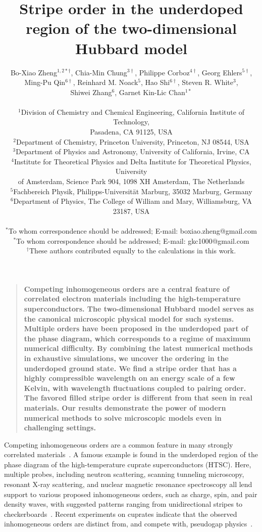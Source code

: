\documentclass[12pt]{article}
\title{Stripe order in the underdoped region of the two-dimensional Hubbard model}
\author{Bo-Xiao Zheng$^{1,2\ast\dag}$, Chia-Min Chung$^{3\dag}$, Philippe Corboz$^{4\dag}$, Georg Ehlers$^{5\dag}$,\\
  Ming-Pu Qin$^{6\dag}$, Reinhard M. Noack$^{5}$, Hao Shi$^{6\dag}$, Steven R. White$^{3}$, \\
  Shiwei Zhang$^{6}$, Garnet Kin-Lic Chan$^{1\ast}$\\
\\
\normalsize{$^{1}$Division of Chemistry and Chemical Engineering, California Institute of Technology,}\\
\normalsize{Pasadena, CA 91125, USA}\\
\normalsize{$^{2}$Department of Chemistry, Princeton University, Princeton, NJ 08544, USA}\\
\normalsize{$^{3}$Department of Physics and Astronomy, University of California, Irvine, CA}\\
\normalsize{$^{4}$Institute for Theoretical Physics and Delta Institute for Theoretical Physics, University }\\
\normalsize{of Amsterdam, Science Park 904, 1098 XH Amsterdam, The Netherlands}\\
\normalsize{$^{5}$Fachbereich Physik, Philipps-Universit\"at Marburg, 35032 Marburg, Germany}\\
\normalsize{$^{6}$Department of Physics, The College of William and Mary, Williamsburg, VA 23187, USA}\\
\\
\normalsize{$^\ast$To whom correspondence should be addressed; E-mail:  boxiao.zheng@gmail.com}\\
\normalsize{$^\ast$To whom correspondence should be addressed; E-mail:  gkc1000@gmail.com}\\
\normalsize{$^\dag$These authors contributed equally to the calculations in this work.}
}
\date{}
\newenvironment{sciabstract}{%
\begin{quote} \bf}
{\end{quote}}
\begin{document}
\baselineskip24pt
\maketitle

\begin{sciabstract}
Competing inhomogeneous orders are a central feature of correlated electron materials including the high-temperature superconductors.
The two-dimensional Hubbard model  serves as the canonical microscopic physical model for such systems.
Multiple orders have been proposed in the underdoped part of the phase diagram, which corresponds
to a regime of maximum numerical difficulty.
By combining the latest numerical methods in exhaustive simulations, we uncover the ordering
in the underdoped ground state. We find a stripe order that has a highly compressible wavelength
on an energy scale of a few Kelvin, with wavelength fluctuations coupled to pairing order. 
The favored filled stripe order is different from that seen in real materials.
Our results demonstrate the power of 
modern numerical methods to solve microscopic models even in challenging settings.
\end{sciabstract}

Competing inhomogeneous orders are a common feature in many strongly correlated materials~\cite{Dagotto2005}.
A famous example is found in the underdoped region of the phase diagram of the
high-temperature cuprate superconductors (HTSC).  Here, multiple probes,
including neutron scattering, scanning tunneling microscopy, resonant X-ray
scattering, and nuclear magnetic resonance spectroscopy all lend support to various proposed inhomogeneous orders, such as
charge, spin, and pair density waves, with suggested patterns ranging from
unidirectional stripes to checkerboards~\cite{comin2016resonant,julien2015}. Recent
experiments on cuprates  indicate that the observed inhomogeneous
orders are distinct from, and compete with, pseudogap
physics~\cite{parker2010fluctuating,gerber2015three}.

\end{document}
